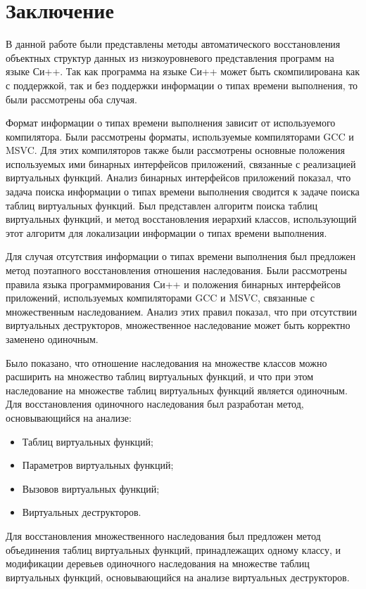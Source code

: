 \newpage
\section*{Заключение}
В данной работе были представлены методы автоматического восстановления объектных структур данных из низкоуровневого представления программ на языке Си++. Так как программа на языке Си++ может быть скомпилирована как с поддержкой, так и без поддержки информации о типах времени выполнения, то были рассмотрены оба случая.

Формат информации о типах времени выполнения зависит от используемого компилятора. Были рассмотрены форматы, используемые компиляторами GCC и MSVC. Для этих компиляторов также были рассмотрены основные положения используемых ими бинарных интерфейсов приложений, связанные с реализацией виртуальных функций. Анализ бинарных интерфейсов приложений показал, что задача поиска информации о типах времени выполнения сводится к задаче поиска таблиц виртуальных функций. Был представлен алгоритм поиска таблиц виртуальных функций, и метод восстановления иерархий классов, использующий этот алгоритм для локализации информации о типах времени выполнения.

Для случая отсутствия информации о типах времени выполнения был предложен метод поэтапного восстановления отношения наследования. Были рассмотрены правила языка программирования Си++ и положения бинарных интерфейсов приложений, используемых компиляторами GCC и MSVC, связанные с множественным наследованием. Анализ этих правил показал, что при отсутствии виртуальных деструкторов, множественное наследование может быть корректно заменено одиночным.

Было показано, что отношение наследования на множестве классов можно расширить на множество таблиц виртуальных функций, и что при этом наследование на множестве таблиц виртуальных функций является одиночным. Для восстановления одиночного наследования был разработан метод, основывающийся на анализе:
\begin{itemize}
\item Таблиц виртуальных функций;
\item Параметров виртуальных функций;
\item Вызовов виртуальных функций;
\item Виртуальных деструкторов.
\end{itemize}

Для восстановления множественного наследования был предложен метод объединения таблиц виртуальных функций, принадлежащих одному классу, и модификации деревьев одиночного наследования на множестве таблиц виртуальных функций, основывающийся на анализе виртуальных деструкторов.

